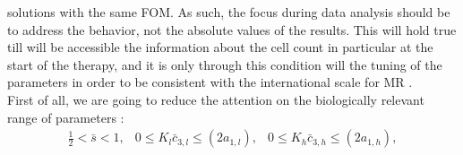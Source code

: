\documentclass[a4paper,10pt]{article}
\begin{document}
solutions with the same FOM.
As such, the focus during data analysis
should be to address the behavior, 
not the absolute values of the results.
This will hold true till will be accessible the information about
the cell count in particular at the start of the therapy,
and it is only through this condition will the tuning of the
parameters in order to be consistent with the international
scale for MR \cite{white2013establishment}.\\ 
First of all, we are going to reduce the attention 
on the biologically 
relevant range of parameters \cite{stiehl2012mathematical}:
\begin{equation}
\begin{array}{lll}
\frac{1}{2}<\bar{s}<1, & 0\leq K_{l}\bar{c}_{3,l}\leq (2a_{1,l}), & 0\leq K_{h}\bar{c}_{3,h}\leq (2a_{1,h}), \\ 
\end{array}
\end{equation}
\end{document}
